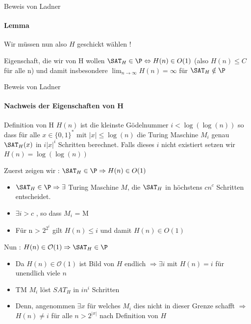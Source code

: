 \begin{frame}{Beweis von Ladner}
	\framesubtitle{Lemma}
	Wir müssen nun also $H$ geschickt wählen !
	\pause
	\begin{KITblock}{Eigenschaft, die wir von H wollen}
		${\SAT}_H \in \P \Leftrightarrow H(n) \in O(1)$ (also $H(n) \leq C$ f\"ur alle n) 				\newline
		und damit insbesondere $\lim_{n \to \infty}  H(n) = \infty$ f\"ur ${\SAT}_H
		\notin \P$
		
	\end{KITblock}	
\end{frame}
\begin{frame}{Beweis von Ladner}
	\framesubtitle{Nachweis der Eigenschaften von H}
 	\begin{KITinfoblock}{Definition von H}
		$H(n)$ ist die kleinste Gödelnummer $i < \log (\log (n))$ so dass für alle
		$ x \in \{0,1\}^*$ mit $|x| \leq \log(n) $ die Turing Maschine $M_i$ genau ${\SAT}_H(x)$
		in $i|x|^i$ Schritten berechnet. Falls dieses $i$ nicht existiert setzen wir 
		$H(n) = \log(\log(n))$ 
	\end{KITinfoblock}
	\pause
	
	\begin{overprint}
		 {
			\bigskip
		Zuerst zeigen wir : ${\SAT}_H \in \P \Rightarrow H(n) \in O(1)$
		\pause
		\begin{itemize}[<+->]
			\item ${\SAT}_H \in \P \Rightarrow \exists$ Turing Maschine $M$, die
			${\SAT}_H$ in höchstens $cn^c$ Schritten entscheidet.
			\item $\exists i > c$ , so dass $M_i$ = M
			\item Für n > $2^{2^i}$ gilt $H(n) \leq i$ und damit $H(n) \in O(1)$ 
		\end{itemize}
		}
		\only<6-> {
			\bigskip
			Nun : $ H(n) \in \mathcal{O}(1) \Rightarrow {\SAT}_H \in \P$
			\pause
			\begin{itemize}
				\item<7-> Da $ H(n) \in \mathcal{O}(1)$ ist Bild von $H$ endlich $ \Rightarrow \exists i$ mit $H(n) = i$ für unendlich viele $n$
				\item<8-> TM $M_i$ löst ${SAT}_H$ in $ in^i$ Schritten
				\item<9-> Denn, angenommen $\exists x$ für welches $M_i$ dies nicht in dieser Grenze schafft $\Rightarrow$ $H(n) \neq i$ für alle $ n > 2^{|x|} $
				nach Definition von $H$
				
			\end{itemize}
		
		}
	\end{overprint}
	
	
\end{frame}
